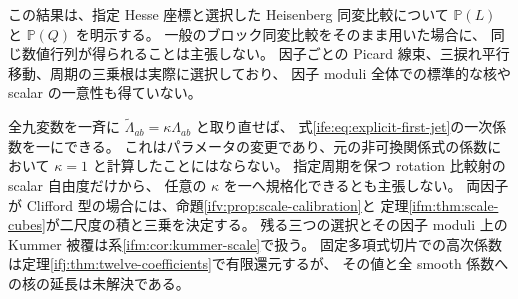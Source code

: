 \begin{remark}[比較の選択と尺度の較正]
\label{ife:rem:normalization-scope}
この結果は、指定 Hesse 座標と選択した Heisenberg 同変比較について
$\mathbb P(L)$ と $\mathbb P(Q)$ を明示する。
一般のブロック同変比較をそのまま用いた場合に、
同じ数値行列が得られることは主張しない。
因子ごとの Picard 線束、三捩れ平行移動、周期の三乗根は実際に選択しており、
因子 moduli 全体での標準的な核や scalar の一意性も得ていない。

全九変数を一斉に $\widetilde\Lambda_{ab}=\kappa\Lambda_{ab}$ と取り直せば、
式\eqref{ife:eq:explicit-first-jet}の一次係数を一にできる。
これはパラメータの変更であり、元の非可換関係式の係数において
$\kappa=1$ と計算したことにはならない。
指定周期を保つ rotation 比較射の scalar 自由度だけから、
任意の $\kappa$ を一へ規格化できるとも主張しない。
両因子が Clifford 型の場合には、命題\ref{ifv:prop:scale-calibration}と
定理\ref{ifm:thm:scale-cubes}が二尺度の積と三乗を決定する。
残る三つの選択とその因子 moduli 上の Kummer 被覆は系\ref{ifm:cor:kummer-scale}で扱う。
固定多項式切片での高次係数は定理\ref{ifj:thm:twelve-coefficients}で有限還元するが、
その値と全 smooth 係数への核の延長は未解決である。
\end{remark}
